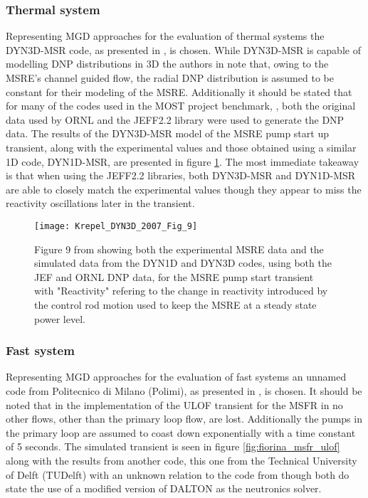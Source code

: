 \documentclass[review]{elsarticle}
\begin{document}
\subsubsection{Thermal system} \label{sssec:mgd_ts}
Representing MGD approaches for the evaluation of thermal systems the DYN3D-MSR
code, as presented in \cite{krepel_dyn3d-msr_2007}, is chosen. While DYN3D-MSR is
capable of modelling DNP distributions in 3D the authors in
\cite{krepel_dyn3d-msr_2007} note that, owing to the MSRE's channel guided flow,
the radial DNP distribution is assumed to be constant for their modeling of the
MSRE. Additionally it should be stated that for many of the codes used in the
MOST project benchmark, \cite{delpech_benchmark_2003}, both the original data used
by ORNL and the JEFF2.2 library were used to generate the DNP data.
The results of the DYN3D-MSR model of the MSRE pump start up transient,
along with the experimental values and those obtained using a similar 1D code,
DYN1D-MSR, are presented in figure \ref{fig:krepel_dyn3d_msre_pump_start}. The most
immediate takeaway is that when using the JEFF2.2 libraries, both DYN3D-MSR and
DYN1D-MSR are able to closely match the experimental values though they appear to
miss the reactivity oscillations later in the transient.

\begin{figure}[h]
   \centering
   \texttt{[image: Krepel\_DYN3D\_2007\_Fig\_9]}
   \caption{Figure 9 from \cite{krepel_dyn3d-msr_2007} showing both the experimental MSRE data
   and the simulated data from the DYN1D and DYN3D codes, using both the JEF and ORNL DNP data, for
   the MSRE pump start transient with "Reactivity" refering to the change in reactivity introduced
   by the control rod motion used to keep the MSRE at a steady state power level.} 
   \label{fig:krepel_dyn3d_msre_pump_start}
\end{figure}

\subsubsection{Fast system} \label{sssec:mgd_fs}
Representing MGD approaches for the evaluation of fast systems an unnamed code
from Politecnico di Milano (Polimi), as presented in \cite{fiorina_modelling_2014}, is
chosen. It should be noted that in the implementation of the ULOF transient for
the MSFR in \cite{fiorina_modelling_2014} no other flows, other than the primary
loop flow, are lost. Additionally the pumps in the primary loop are assumed to
coast down exponentially with a time constant of 5 seconds. The simulated transient is
seen in figure \ref{fig:fiorina_msfr_ulof} along with the results from another
code, this one from the Technical University of Delft (TUDelft) with an unknown relation to
the code from \cite{kophazi_development_2009} though both do state the use of a
modified version of DALTON as the neutronics solver. 
\end{document}
